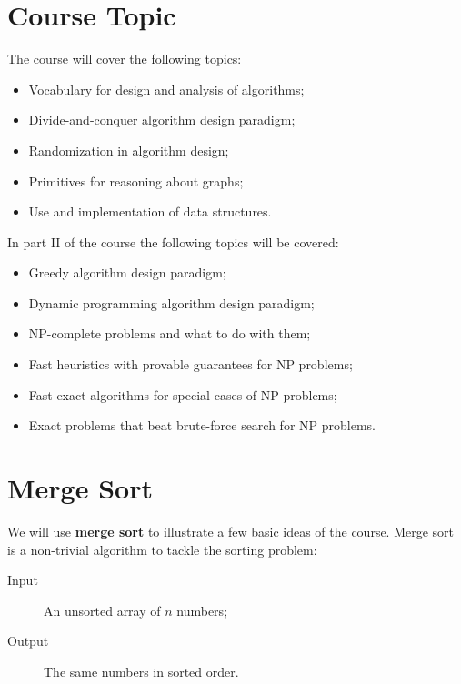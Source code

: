 \section{Course Topic}
The course will cover the following topics:
\begin{itemize}
\item Vocabulary for design and analysis of algorithms;
\item Divide-and-conquer algorithm design paradigm;
\item Randomization in algorithm design;
\item Primitives for reasoning about graphs;
\item Use and implementation of data structures.
\end{itemize}
In part II of the course the following topics will be covered:
\begin{itemize}
\item Greedy algorithm design paradigm;
\item Dynamic programming algorithm design paradigm;
\item NP-complete problems and what to do with them;
\item Fast heuristics with provable guarantees for NP problems;
\item Fast exact algorithms for special cases of NP problems;
\item Exact problems that beat brute-force search for NP problems.
\end{itemize}
\section{Merge Sort}
We will use \textbf{merge sort} to illustrate a few basic ideas of the course. Merge sort is a non-trivial algorithm to tackle the sorting problem:
\begin{description}
\item[Input]An unsorted array of $n$ numbers;
\item[Output]The same numbers in sorted order.
\end{description}
